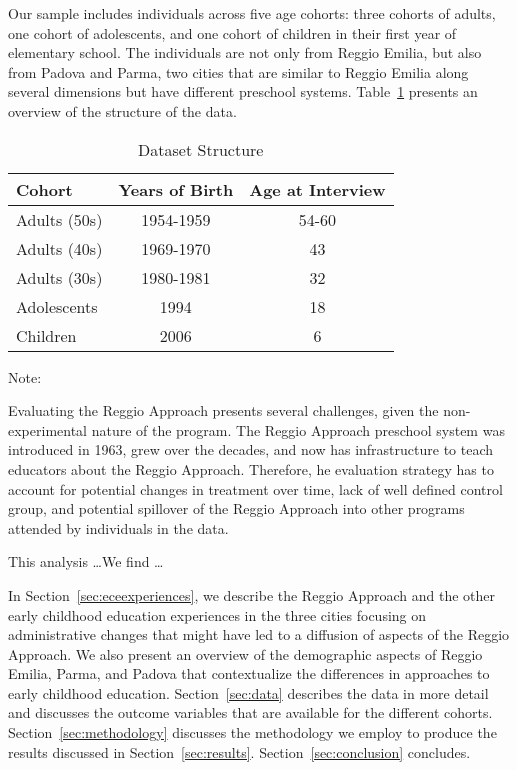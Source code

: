 Our sample includes individuals across five age cohorts: three cohorts of adults, one cohort of adolescents, and one cohort of children in their first year of elementary school. The individuals are not only from Reggio Emilia, but also from Padova and Parma, two cities that are similar to Reggio Emilia along several dimensions but have different preschool systems. Table~\ref{tab:overview} presents an overview of the structure of the data.

\begin{table}[H]
\centering
\begin{threeparttable}
\caption{Dataset Structure} \label{tab:overview}
\begin{tabular}{lcc}
\toprule
Cohort 			& Years of Birth 	& Age at Interview \\ \midrule
Adults (50s)	  	& 1954-1959 		& 54-60 \\
Adults (40s)	   	& 1969-1970		& 43	\\
Adults (30s)    		& 1980-1981		& 32    \\
Adolescents 	   	& 1994			& 18 	\\
Children 	   		& 2006			& 6 \\ 
\bottomrule 
\end{tabular}
\begin{tablenotes}
Note:
\end{tablenotes}
\end{threeparttable}
\end{table}

Evaluating the Reggio Approach presents several challenges, given the non-experimental nature of the program. The Reggio Approach preschool system was introduced in 1963, grew over the decades, and now has infrastructure to teach educators about the Reggio Approach. Therefore, he evaluation strategy has to account for potential changes in treatment over time, lack of well defined control group, and potential spillover of the Reggio Approach into other programs attended by individuals in the data. 

This analysis \ldots We find \ldots

In Section~\ref{sec:eceexperiences}, we describe the Reggio Approach and the other early childhood education experiences in the three cities focusing on administrative changes that might have led to a diffusion of aspects of the Reggio Approach. We also present an overview of the demographic aspects of Reggio Emilia, Parma, and Padova that contextualize the differences in approaches to early childhood education. Section~\ref{sec:data} describes the data in more detail and discusses the outcome variables that are available for the different cohorts. Section~\ref{sec:methodology} discusses the methodology we employ to produce the results discussed in Section~\ref{sec:results}. Section~\ref{sec:conclusion} concludes.

